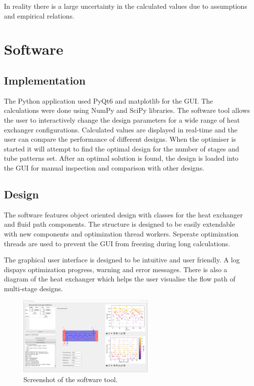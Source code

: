 \documentclass{article}
\begin{document}
In reality there is a large uncertainty in the calculated values due to assumptions and empirical relations.


\section{Software}

\subsection{Implementation}

The Python application used PyQt6 and matplotlib for the GUI. The calculations were done using NumPy and SciPy libraries.
The software tool allows the user to interactively change the design parameters for a wide range of heat exchanger configurations.
Calculated values are displayed in real-time and the user can compare the performance of different designs.
When the optimiser is started it will attempt to find the optimal design for the number of stages and tube patterns set.
After an optimal solution is found, the design is loaded into the GUI for manual inspection and comparison with other designs.

\subsection{Design}
The software features object oriented design with classes for the heat exchanger and fluid path components.
The structure is designed to be easily extendable with new components and optimization thread workers.
Seperate optimization threads are used to prevent the GUI from freezing during long calculations.

The graphical user interface is designed to be intuitive and user friendly. A log dispays optimization progress, warning and error messages. There is also a diagram of the heat exchanger which helps
the user visualise the flow path of multi-stage designs.

\begin{figure}[H]
  \centering
  \includegraphics[width=0.6\textwidth]{software.png}
  \caption{Screenshot of the software tool.}
  \label{fig:software}
\end{figure}
\end{document}
